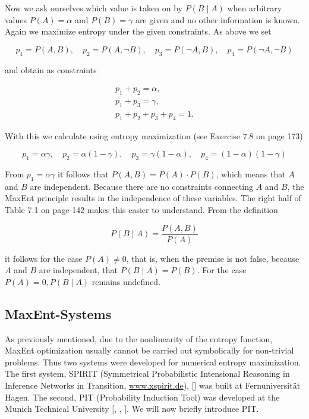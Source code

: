 \documentclass[10pt]{book}
\begin{document}
Now we ask ourselves which value is taken on by $P(B \mid A)$ when arbitrary values $P(A)=\alpha$ and $P(B)=\gamma$ are given and no other information is known. Again we maximize entropy under the given constraints. As above we set

$$
p_{1}=P(A, B), \quad p_{2}=P(A, \neg B), \quad p_{3}=P(\neg A, B), \quad p_{4}=P(\neg A, \neg B)
$$

and obtain as constraints

\begin{gather*}
p_{1}+p_{2}=\alpha,  \tag{7.10}\\
p_{1}+p_{3}=\gamma,  \tag{7.11}\\
p_{1}+p_{2}+p_{3}+p_{4}=1 . \tag{7.12}
\end{gather*}

With this we calculate using entropy maximization (see Exercise 7.8 on page 173)

$$
p_{1}=\alpha \gamma, \quad p_{2}=\alpha(1-\gamma), \quad p_{3}=\gamma(1-\alpha), \quad p_{4}=(1-\alpha)(1-\gamma)
$$

From $p_{1}=\alpha \gamma$ it follows that $P(A, B)=P(A) \cdot P(B)$, which means that $A$ and $B$ are independent. Because there are no constraints connecting $A$ and $B$, the MaxEnt principle results in the independence of these variables. The right half of Table 7.1 on page 142 makes this easier to understand. From the definition

$$
P(B \mid A)=\frac{P(A, B)}{P(A)}
$$

it follows for the case $P(A) \neq 0$, that is, when the premise is not false, because $A$ and $B$ are independent, that $P(B \mid A)=P(B)$. For the case $P(A)=0, P(B \mid A)$ remains undefined.

\subsection{MaxEnt-Systems}
As previously mentioned, due to the nonlinearity of the entropy function, MaxEnt optimization usually cannot be carried out symbolically for non-trivial problems. Thus two systems were developed for numerical entropy maximization. The first system, SPIRIT (Symmetrical Probabilistic Intensional Reasoning in Inference Networks in Transition, \href{http://www.xspirit.de}{www.xspirit.de}), [\cite{rodder1996spirit}] was built at Fernuniversität Hagen. The second, PIT (Probability Induction Tool) was developed at the Munich Technical University [\cite{schramm1996indifferenz}, \cite{ertel1999maxent}, \cite{schramm2000pit}]. We will now briefly introduce PIT.
\end{document}
